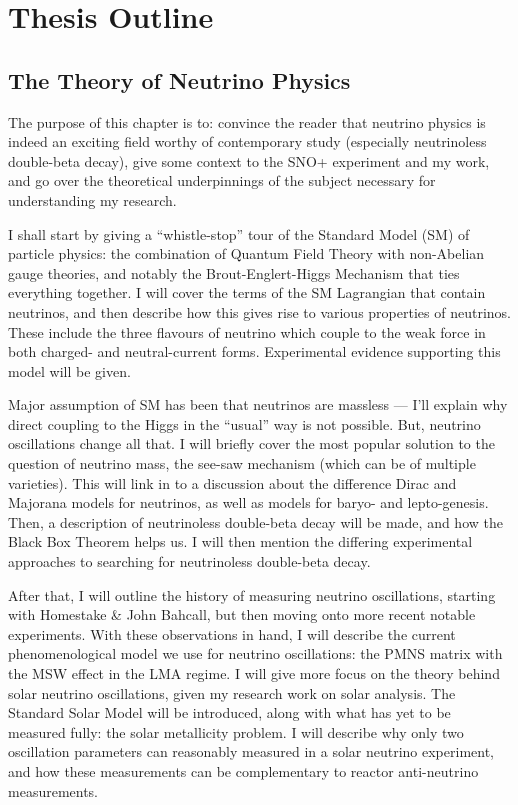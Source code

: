 \section{Thesis Outline}\label{sect:thesis_outline}
\subsection{The Theory of Neutrino Physics}
The purpose of this chapter is to: convince the reader that neutrino physics is indeed an exciting field worthy of contemporary study (especially neutrinoless double-beta decay), give some context to the SNO+ experiment and my work, and go over the theoretical underpinnings of the subject necessary for understanding my research.

I shall start by giving a ``whistle-stop'' tour of the Standard Model (SM) of particle physics: the combination of Quantum Field Theory with non-Abelian gauge theories, and notably the Brout-Englert-Higgs Mechanism that ties everything together. I will cover the terms of the SM Lagrangian that contain neutrinos, and then describe how this gives rise to various properties of neutrinos. These include the three flavours of neutrino which couple to the weak force in both charged- and neutral-current forms. Experimental evidence supporting this model will be given.

Major assumption of SM has been that neutrinos are massless --- I'll explain why direct coupling to the Higgs in the ``usual'' way is not possible. But, neutrino oscillations change all that. I will briefly cover the most popular solution to the question of neutrino mass, the see-saw mechanism (which can be of multiple varieties). This will link in to a discussion about the difference Dirac and Majorana models for neutrinos, as well as models for baryo- and lepto-genesis. Then, a description of neutrinoless double-beta decay will be made, and how the Black Box Theorem helps us. I will then mention the differing experimental approaches to searching for neutrinoless double-beta decay.

After that, I will outline the history of measuring neutrino oscillations, starting with Homestake \& John Bahcall, but then moving onto more recent notable experiments. With these observations in hand, I will describe the current phenomenological model we use for neutrino oscillations: the PMNS matrix with the MSW effect in the LMA regime. I will give more focus on the theory behind solar neutrino oscillations, given my research work on solar analysis. The Standard Solar Model will be introduced, along with what has yet to be measured fully: the solar metallicity problem. I will describe why only two oscillation parameters can reasonably measured in a solar neutrino experiment, and how these measurements can be complementary to reactor anti-neutrino measurements.


